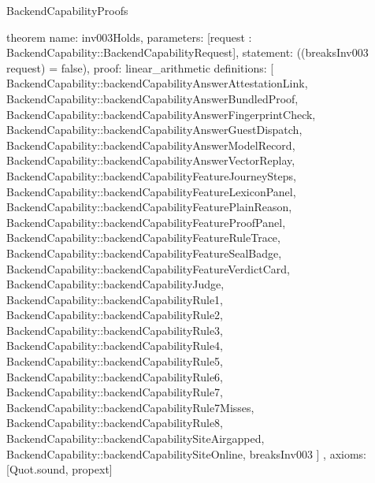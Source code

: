 \begin{lexlean}{BackendCapabilityProofs}
\begin{semanticmodule}
theorem{
  name: inv003Holds,
  parameters: [request : BackendCapability::BackendCapabilityRequest],
  statement: ((breaksInv003 request) = false),
  proof: linear_arithmetic{
    definitions: [
      BackendCapability::backendCapabilityAnswerAttestationLink,
      BackendCapability::backendCapabilityAnswerBundledProof,
      BackendCapability::backendCapabilityAnswerFingerprintCheck,
      BackendCapability::backendCapabilityAnswerGuestDispatch,
      BackendCapability::backendCapabilityAnswerModelRecord,
      BackendCapability::backendCapabilityAnswerVectorReplay,
      BackendCapability::backendCapabilityFeatureJourneySteps,
      BackendCapability::backendCapabilityFeatureLexiconPanel,
      BackendCapability::backendCapabilityFeaturePlainReason,
      BackendCapability::backendCapabilityFeatureProofPanel,
      BackendCapability::backendCapabilityFeatureRuleTrace,
      BackendCapability::backendCapabilityFeatureSealBadge,
      BackendCapability::backendCapabilityFeatureVerdictCard,
      BackendCapability::backendCapabilityJudge,
      BackendCapability::backendCapabilityRule1,
      BackendCapability::backendCapabilityRule2,
      BackendCapability::backendCapabilityRule3,
      BackendCapability::backendCapabilityRule4,
      BackendCapability::backendCapabilityRule5,
      BackendCapability::backendCapabilityRule6,
      BackendCapability::backendCapabilityRule7,
      BackendCapability::backendCapabilityRule7Misses,
      BackendCapability::backendCapabilityRule8,
      BackendCapability::backendCapabilitySiteAirgapped,
      BackendCapability::backendCapabilitySiteOnline,
      breaksInv003
    ]
  },
  axioms: [Quot.sound, propext]
}
\end{semanticmodule}
\end{lexlean}

